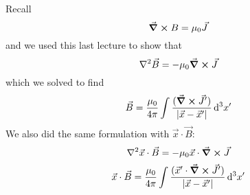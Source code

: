 \documentclass[a4paper,twoside,master.tex]{subfiles}
\begin{document}
Recall
\begin{equation}
    \curl{B} = \mu_0 \vec{J}
\end{equation}
and we used this last lecture to show that
\begin{equation}
    \laplacian{ \vec{B}} = - \mu_0 \curl{ \vec{J}}
\end{equation}
which we solved to find
\begin{equation}
    \vec{B} = \frac{\mu_0}{4 \pi} \int \frac{( \curl{ \vec{J}'})}{\abs{ \vec{x} - \vec{x}'}} \dd[3]{x'}
\end{equation}
We also did the same formulation with $ \vec{x} \cdot \vec{B} $:
\begin{equation}
    \laplacian{ \vec{x} \cdot \vec{B}} = - \mu_0 \vec{x} \cdot \curl{ \vec{J}}
\end{equation}
\begin{equation}
    \vec{x} \cdot \vec{B} = \frac{\mu_0}{4 \pi} \int \frac{(\vec{x}' \cdot \curl{ \vec{J}'})}{\abs{ \vec{x} - \vec{x}'}} \dd[3]{x'}
\end{equation}
\end{document}
